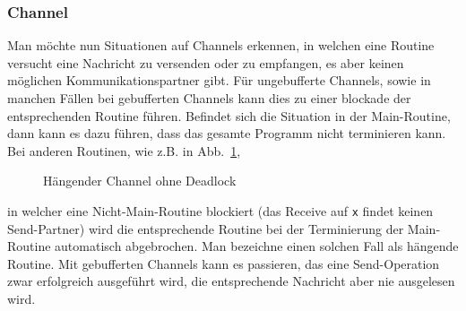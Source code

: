 \subsubsection{Channel}\label{Chap:Theo-Sec:Analyze-SubSec:Channel}
Man möchte nun Situationen auf Channels erkennen, in welchen eine 
Routine versucht eine Nachricht zu versenden oder zu empfangen, es aber 
keinen möglichen Kommunikationspartner gibt. Für ungebufferte 
Channels, sowie in manchen Fällen bei gebufferten Channels kann dies zu einer 
blockade der entsprechenden Routine führen. Befindet sich die Situation in 
der Main-Routine, dann kann es dazu führen, dass das gesamte Programm 
nicht terminieren kann. Bei anderen Routinen, wie z.B. in 
Abb.~\ref{Chap:Analyze-Sec:Channel-SubSec:Dangling-Fig:ExDanglingWithout}, 
\begin{figure}[h!]
  
  \caption{Hängender Channel ohne Deadlock}
  \label{Chap:Analyze-Sec:Channel-SubSec:Dangling-Fig:ExDanglingWithout}
\end{figure}
in welcher eine Nicht-Main-Routine blockiert (das Receive auf \texttt{x} findet 
keinen Send-Partner) wird die entsprechende Routine bei der Terminierung 
der Main-Routine automatisch abgebrochen. Man bezeichne einen solchen Fall 
als hängende Routine. Mit gebufferten Channels kann es passieren, 
das eine Send-Operation zwar erfolgreich ausgeführt wird, die entsprechende
Nachricht aber nie ausgelesen wird.\\\\


